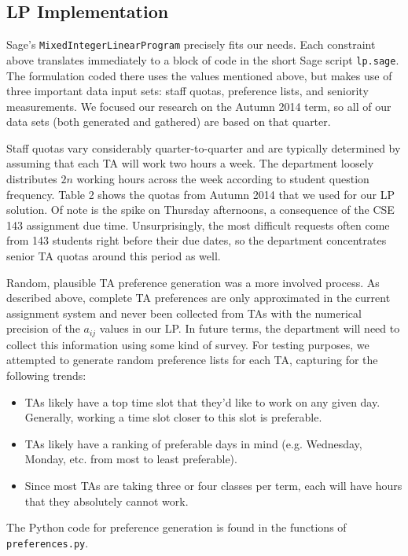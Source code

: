 \documentclass{article}
\begin{document}
\begin{multicols}{2}
\section*{LP Implementation}

Sage's \texttt{MixedIntegerLinearProgram} precisely fits our needs. Each constraint above translates immediately to a block of code in the short Sage script \texttt{lp.sage}. The formulation coded there uses the values mentioned above, but makes use of three important data input sets: staff quotas, preference lists, and seniority measurements. We focused our research on the Autumn 2014 term, so all of our data sets (both generated and gathered) are based on that quarter.

Staff quotas vary considerably quarter-to-quarter and are typically determined by assuming that each TA will work two hours a week. The department loosely distributes $2n$ working hours across the week according to student question frequency. Table 2 shows the quotas from Autumn 2014 that we used for our LP solution. Of note is the spike on Thursday afternoons, a consequence of the CSE 143 assignment due time. Unsurprisingly, the most difficult requests often come from 143 students right before their due dates, so the department concentrates senior TA quotas around this period as well.

Random, plausible TA preference generation was a more involved process. As described above, complete TA preferences are only approximated in the current assignment system and never been collected from TAs with the numerical precision of the $a_{ij}$ values in our LP. In future terms, the department will need to collect this information using some kind of survey. For testing purposes, we attempted to generate random preference lists for each TA, capturing for the following trends:
\begin{itemize}
   \item TAs likely have a top time slot that they'd like to work on any given day. Generally, working a time slot closer to this slot is preferable.
   \item TAs likely have a ranking of preferable days in mind (e.g. Wednesday, Monday, etc. from most to least preferable).
   \item Since most TAs are taking three or four classes per term, each will have hours that they absolutely cannot work.
\end{itemize}

The Python code for preference generation is found in the functions of \texttt{preferences.py}.


\end{multicols}
\end{document}
